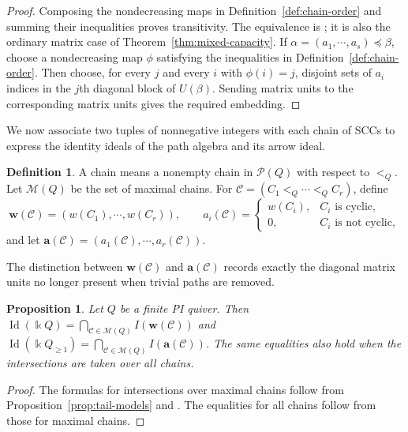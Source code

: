 \documentclass[11pt,reqno]{amsart}
\newcommand{\kk}{\Bbbk}
\newcommand{\Id}{\operatorname{Id}}
\newtheorem{proposition}[theorem]{Proposition}
\theoremstyle{definition}
\newtheorem{definition}[theorem]{Definition}
\theoremstyle{remark}
\numberwithin{equation}{section}
\begin{document}
\begin{proof}
Composing the nondecreasing maps in Definition~\ref{def:chain-order}
and summing their inequalities proves transitivity.
The equivalence is \cite[Theorem~2.3]{Berele2012}; it is also the
ordinary matrix case of Theorem~\ref{thm:mixed-capacity}.
If $\alpha=(a_1,\cdots,a_s)\preceq\beta$, choose a
nondecreasing map $\phi$ satisfying the inequalities
in Definition~\ref{def:chain-order}. Then choose, for every
$j$ and every $i$ with $\phi(i)=j$, disjoint sets of $a_i$ indices
in the $j$th diagonal block of $U(\beta)$.
Sending matrix units to the corresponding matrix units gives
the required embedding.
\end{proof}

We now associate two tuples of nonnegative integers with each
chain of SCCs to express the identity ideals of the path algebra
and its arrow ideal.


\begin{definition}\label{def:chain-weights}
A chain means a nonempty chain in $\mathcal P(Q)$ with respect
to $<_Q$. Let $\mathscr M(Q)$ be the set of maximal chains.
For $\mathcal C=(C_1<_Q\cdots<_Q C_r)$, define
\[
 \mathbf w(\mathcal C)=(w(C_1),\cdots,w(C_r)),
 \qquad
 a_i(\mathcal C)=
 \begin{cases}
 w(C_i),&C_i\text{ is cyclic},\\
 0,&C_i\text{ is not cyclic},
 \end{cases}
\]
and let $\mathbf a(\mathcal C)=(a_1(\mathcal C),\cdots,a_r(\mathcal C))$.
\end{definition}

The distinction between $\mathbf w(\mathcal C)$ and
$\mathbf a(\mathcal C)$ records exactly the diagonal matrix units
no longer present when trivial paths are removed.

\begin{proposition}\label{prop:chain-formulas}
Let $Q$ be a finite PI quiver. Then $
 \Id(\kk Q)
 =\bigcap_{\mathcal C\in\mathscr M(Q)}
     I(\mathbf w(\mathcal C))$ and
$ \Id(\kk Q_{\ge1})
 =\bigcap_{\mathcal C\in\mathscr M(Q)}
     I(\mathbf a(\mathcal C))$.
The same equalities also hold when the intersections are taken over all chains.
\end{proposition}

\begin{proof}
The formulas for intersections over maximal chains follow from Proposition~\ref{prop:tail-models}
and \cite[Theorem~1.1]{Berele2012}.
The equalities for all chains follow
from those for maximal chains.
\end{proof}
\end{document}

